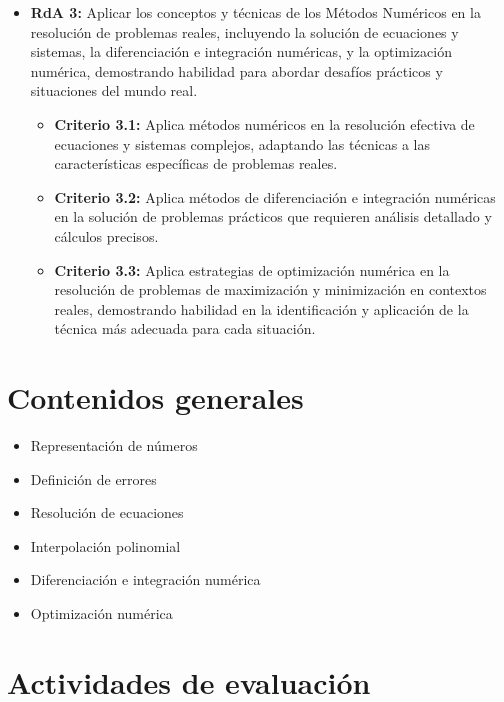 \documentclass[a4,11pt]{aleph-notas}
\begin{document}
\begin{itemize}[leftmargin=*]
\begin{itemize}[leftmargin=*]
    \end{itemize}
\item
    \textbf{RdA 3:} Aplicar los conceptos y técnicas de los Métodos Numéricos en la resolución de problemas reales, incluyendo la solución de ecuaciones y sistemas, la diferenciación e integración numéricas, y la optimización numérica, demostrando habilidad para abordar desafíos prácticos y situaciones del mundo real.
    \begin{itemize}[leftmargin=*]
        \item \textbf{Criterio 3.1:} Aplica métodos numéricos en la resolución efectiva de ecuaciones y sistemas complejos, adaptando las técnicas a las características específicas de problemas reales.
        \item \textbf{Criterio 3.2:} Aplica métodos de diferenciación e integración numéricas en la solución de problemas prácticos que requieren análisis detallado y cálculos precisos.
        \item \textbf{Criterio 3.3:} Aplica estrategias de optimización numérica en la resolución de problemas de maximización y minimización en contextos reales, demostrando habilidad en la identificación y aplicación de la técnica más adecuada para cada situación.
    \end{itemize}
\end{itemize}

\section{Contenidos generales} 

\begin{itemize}
\item 
    Representación de números
\item 
    Definición de errores
\item 
    Resolución de ecuaciones
\item 
    Interpolación polinomial
\item 
    Diferenciación e integración numérica
\item 
    Optimización numérica
\end{itemize}

\section{Actividades de evaluación} 
\end{document}
